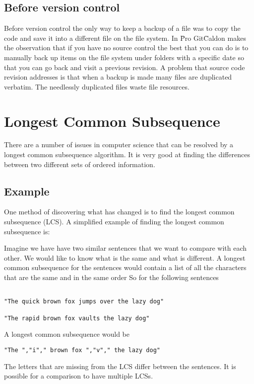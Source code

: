 \subsection{Before version control}
Before version control the only way to keep a backup of a file was to copy the code and save it into a different file on the file system.
In \"Pro Git\" Caldon makes the observation that if you have no source control the best that you can do is to manually back up items on the file system under folders with a specific date so that you can go back and visit a previous revision.  A problem that source code revision addresses is that when a backup is made many files are duplicated verbatim.  The needlessly duplicated files waste file resources.

\section{Longest Common Subsequence}
There are a number of issues in computer science that can be resolved by a longest common subsequence algorithm.
It is very good at finding the differences between two different sets of ordered information.


\subsection{Example}
One method of discovering what has changed is to find the longest common subsequence (LCS).
A simplified example of finding the longest common subsequence is:

Imagine we have have two similar sentences that we want to compare with each other.  
We would like to know what is the same and what is different.
A longest common subsequence for the sentences would contain a list of all the characters that are the same and in the same order
So for the following sentences

\begin{verbatim}

"The quick brown fox jumps over the lazy dog"

"The rapid brown fox vaults the lazy dog"

\end{verbatim}
A longest common subsequence would be
\begin{verbatim}
"The ","i"," brown fox ","v"," the lazy dog"
\end{verbatim}
The letters that are missing from the LCS differ between the sentences.
It is possible for a comparison to have multiple LCSs.

